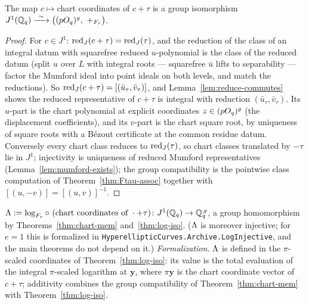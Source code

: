 \begin{theorem}
\label{thm:chart-mem}
\leanok
{}
The map $c \mapsto{}$chart coordinates of $c + \tau$ is a group isomorphism
$J^1(\mathbb{Q}_q) \xrightarrow{\ \sim\ } \big((pO_q)^g,\ +_{F_\tau}\big)$.
\end{theorem}
\begin{proof}
\leanok
For $c \in J^1$: $\operatorname{red}_J(c+\tau) = \operatorname{red}_J(\tau)$, and the reduction of the class of an
integral datum with squarefree reduced $u$-polynomial is the class of the reduced datum
(split $u$ over $L$ with integral roots --- squarefree $\bar u$ lifts to separability
--- factor the Mumford ideal into point ideals on both levels, and match the
reductions). So $\operatorname{red}_J(c+\tau) = [(\bar u_\tau, \bar v_\tau)]$, and
Lemma~\ref{lem:reduce-commutes} shows the reduced representative of $c + \tau$ is
integral with reduction $(\bar u_\tau, \bar v_\tau)$. Its $u$-part is the chart
polynomial at explicit coordinates $z \in (pO_q)^g$ (the displacement coefficients),
and its $v$-part is the chart square root, by uniqueness of square roots with a
B\'ezout certificate at the common residue datum. Conversely every chart class reduces
to $\operatorname{red}_J(\tau)$, so chart classes translated by $-\tau$ lie in $J^1$; injectivity is
uniqueness of reduced Mumford representatives (Lemma~\ref{lem:mumford-exists}); the
group compatibility is the pointwise class computation of
Theorem~\ref{thm:Ftau-assoc} together with $[(u,-v)] = [(u,v)]^{-1}$.
\end{proof}

\begin{definition}
\label{def:Lam}
\leanok
{}
$\Lambda := \log_{F_\tau} \circ\ (\text{chart coordinates of } \cdot + \tau)\colon
J^1(\mathbb{Q}_q) \to \mathbb{Q}_q^{\,g}$, a group homomorphism by Theorems~\ref{thm:chart-mem}
and~\ref{thm:log-iso}. ($\Lambda$ is moreover injective; for $e = 1$ this is formalized in
\texttt{HyperellipticCurves.Archive.LogInjective}, and the main theorems do not depend on it.)
\emph{Formalization.} $\Lambda$ is defined in the $\pi$-scaled coordinates of
Theorem~\ref{thm:log-iso}: its value is the total evaluation of the integral $\pi$-scaled
logarithm at $\mathbf y$, where $\pi\mathbf y$ is the chart coordinate vector of
$c + \tau$; additivity combines the group compatibility of
Theorem~\ref{thm:chart-mem} with Theorem~\ref{thm:log-iso}.
\end{definition}

